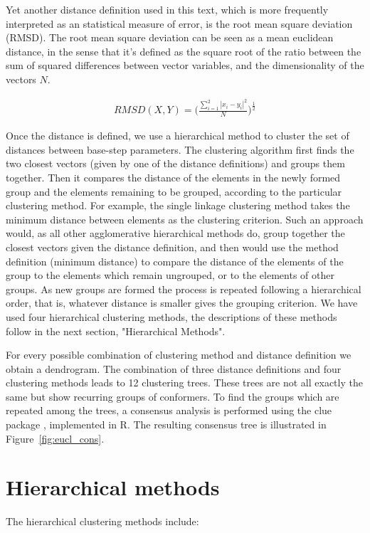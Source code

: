 Yet  another distance  definition used  in  this text,  which is  more
frequently interpreted as an statistical measure of error, is the root
mean square  deviation (RMSD). The  root mean square deviation  can be
seen as a  mean euclidean distance, in the sense  that it's defined as
the square  root of the ratio  between the sum  of squared differences
between vector variables, and the dimensionality of the vectors $N$.

\begin{gather}
RMSD(X,Y)      =     \Big(      \frac{\sum_{i=1}^2     |x_i-y_i|^2}{N}
\Big)^\frac{1}{2} \label{eq:rmsd}
\end{gather}

Once the  distance is defined, we use  a hierarchical method
to cluster  the set of distances between  base-step parameters.  The
clustering algorithm first finds the two closest vectors (given by one
of  the  distance definitions)  and  groups  them  together.  Then  it
compares the  distance of the elements  in the newly  formed group and
the  elements remaining  to be  grouped, according  to  the particular
clustering method.  For example,  the single linkage clustering method
takes  the  minimum  distance   between  elements  as  the  clustering
criterion.  Such an approach would, as all other agglomerative
hierarchical methods do, group together the closest vectors given the
distance definition, and then would use the method definition (minimum
distance) to compare the distance of the elements of the group to the
elements  which  remain  ungrouped,   or  to  the  elements  of  other
groups. As new  groups are formed the process  is repeated following a
hierarchical order,  that is, whatever  distance is smaller  gives the
grouping  criterion.   We   have  used  four  hierarchical  clustering
methods, the descriptions of these methods follow in the next section,
"Hierarchical Methods".

For  every  possible combination  of  clustering  method and  distance
definition we  obtain a dendrogram. The combination  of three distance
definitions and four clustering  methods leads to 12 clustering trees.
These trees are not all exactly  the same but show recurring groups of
conformers.  To find the groups  which are repeated among the trees, a
consensus  analysis  is  performed  using  the  \textsf{clue}  package
\cite{hornik2005}, implemented  in \textsf{R}. The  resulting consensus
tree is illustrated in Figure~\ref{fig:eucl_cons}.

\section{Hierarchical methods}
The hierarchical clustering methods include:

